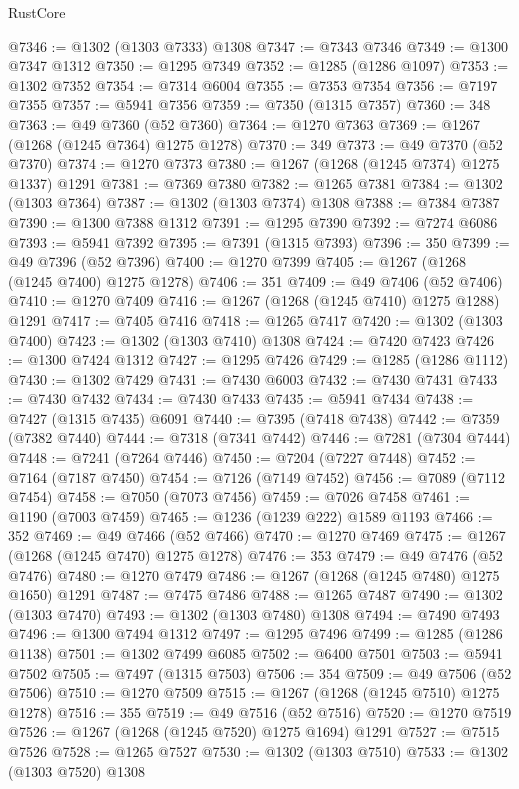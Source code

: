 \begin{lexlean}{RustCore}
\begin{coremodule}
@7346 := @1302 (@1303 @7333) @1308
@7347 := @7343 @7346
@7349 := @1300 @7347 @1312
@7350 := @1295 @7349
@7352 := @1285 (@1286 @1097)
@7353 := @1302 @7352
@7354 := @7314 @6004
@7355 := @7353 @7354
@7356 := @7197 @7355
@7357 := @5941 @7356
@7359 := @7350 (@1315 @7357)
@7360 := 348
@7363 := @49 @7360 (@52 @7360)
@7364 := @1270 @7363
@7369 := @1267 (@1268 (@1245 @7364) @1275 @1278)
@7370 := 349
@7373 := @49 @7370 (@52 @7370)
@7374 := @1270 @7373
@7380 := @1267 (@1268 (@1245 @7374) @1275 @1337) @1291
@7381 := @7369 @7380
@7382 := @1265 @7381
@7384 := @1302 (@1303 @7364)
@7387 := @1302 (@1303 @7374) @1308
@7388 := @7384 @7387
@7390 := @1300 @7388 @1312
@7391 := @1295 @7390
@7392 := @7274 @6086
@7393 := @5941 @7392
@7395 := @7391 (@1315 @7393)
@7396 := 350
@7399 := @49 @7396 (@52 @7396)
@7400 := @1270 @7399
@7405 := @1267 (@1268 (@1245 @7400) @1275 @1278)
@7406 := 351
@7409 := @49 @7406 (@52 @7406)
@7410 := @1270 @7409
@7416 := @1267 (@1268 (@1245 @7410) @1275 @1288) @1291
@7417 := @7405 @7416
@7418 := @1265 @7417
@7420 := @1302 (@1303 @7400)
@7423 := @1302 (@1303 @7410) @1308
@7424 := @7420 @7423
@7426 := @1300 @7424 @1312
@7427 := @1295 @7426
@7429 := @1285 (@1286 @1112)
@7430 := @1302 @7429
@7431 := @7430 @6003
@7432 := @7430 @7431
@7433 := @7430 @7432
@7434 := @7430 @7433
@7435 := @5941 @7434
@7438 := @7427 (@1315 @7435) @6091
@7440 := @7395 (@7418 @7438)
@7442 := @7359 (@7382 @7440)
@7444 := @7318 (@7341 @7442)
@7446 := @7281 (@7304 @7444)
@7448 := @7241 (@7264 @7446)
@7450 := @7204 (@7227 @7448)
@7452 := @7164 (@7187 @7450)
@7454 := @7126 (@7149 @7452)
@7456 := @7089 (@7112 @7454)
@7458 := @7050 (@7073 @7456)
@7459 := @7026 @7458
@7461 := @1190 (@7003 @7459)
@7465 := @1236 (@1239 @222) @1589 @1193
@7466 := 352
@7469 := @49 @7466 (@52 @7466)
@7470 := @1270 @7469
@7475 := @1267 (@1268 (@1245 @7470) @1275 @1278)
@7476 := 353
@7479 := @49 @7476 (@52 @7476)
@7480 := @1270 @7479
@7486 := @1267 (@1268 (@1245 @7480) @1275 @1650) @1291
@7487 := @7475 @7486
@7488 := @1265 @7487
@7490 := @1302 (@1303 @7470)
@7493 := @1302 (@1303 @7480) @1308
@7494 := @7490 @7493
@7496 := @1300 @7494 @1312
@7497 := @1295 @7496
@7499 := @1285 (@1286 @1138)
@7501 := @1302 @7499 @6085
@7502 := @6400 @7501
@7503 := @5941 @7502
@7505 := @7497 (@1315 @7503)
@7506 := 354
@7509 := @49 @7506 (@52 @7506)
@7510 := @1270 @7509
@7515 := @1267 (@1268 (@1245 @7510) @1275 @1278)
@7516 := 355
@7519 := @49 @7516 (@52 @7516)
@7520 := @1270 @7519
@7526 := @1267 (@1268 (@1245 @7520) @1275 @1694) @1291
@7527 := @7515 @7526
@7528 := @1265 @7527
@7530 := @1302 (@1303 @7510)
@7533 := @1302 (@1303 @7520) @1308

\end{coremodule}
\end{lexlean}
